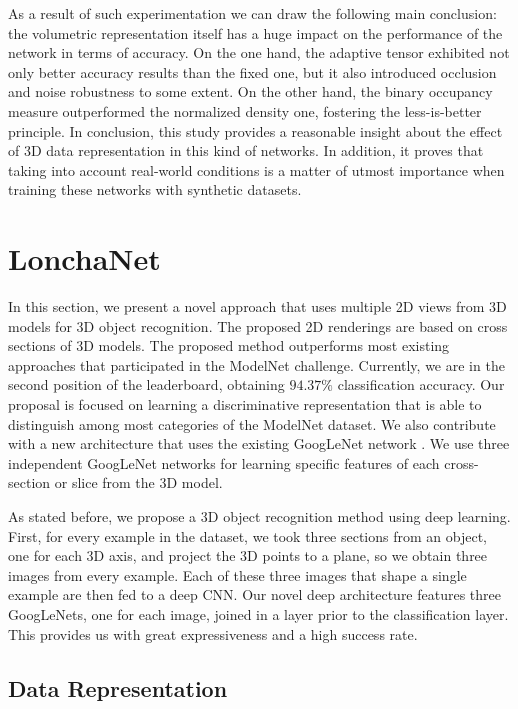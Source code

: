 As a result of such experimentation we can draw the following main conclusion: the volumetric representation itself has a huge impact on the performance of the network in terms of accuracy. On the one hand, the adaptive tensor exhibited not only better accuracy results than the fixed one, but it also introduced occlusion and noise robustness to some extent. On the other hand, the binary occupancy measure outperformed the normalized density one, fostering the less-is-better principle. In conclusion, this study provides a reasonable insight about the effect of \acs{3D} data representation in this kind of networks. In addition, it proves that taking into account real-world conditions is a matter of utmost importance when training these networks with synthetic datasets.

\section{LonchaNet}
\label{cha:objrecog:sec:lonchanet}

In this section, we present a novel approach that uses multiple \ac{2D} views from \acs{3D} models for \acs{3D} object recognition. The proposed 2D renderings are based on cross sections of \acs{3D} models. The proposed method outperforms most existing approaches that participated in the ModelNet challenge. Currently, we are in the second position of the leaderboard, obtaining $94.37\%$ classification accuracy. Our proposal is focused on learning a discriminative representation that is able to distinguish among most categories of the ModelNet dataset. We also contribute with a new architecture that uses the existing GoogLeNet network \cite{Szegedy2015}. We use three independent GoogLeNet networks for learning specific features of each cross-section or slice from the 3D model.

As stated before, we propose a 3D object recognition method using deep learning. First, for every example in the dataset, we took three sections from an object, one for each 3D axis, and project the 3D points to a plane, so we obtain three images from every example.  Each of these three images that shape a single example are then fed to a deep \acl{CNN}. Our novel deep architecture features three GoogLeNets, one for each image, joined in a layer prior to the classification layer. This provides us with great expressiveness and a high success rate.

\subsection{Data Representation}
\label{cha:objrecog:sec:lonchanet:subsec:representation}

